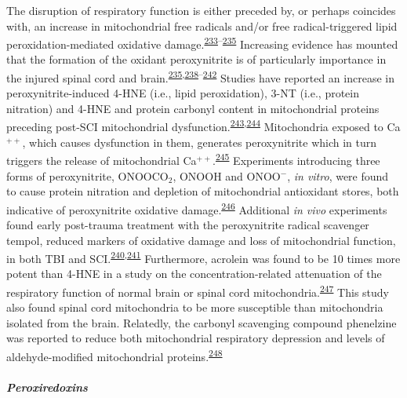 \documentclass[
]{article}
\begin{document}
The disruption of respiratory function is either preceded by, or perhaps coincides with, an increase in mitochondrial free radicals and/or free radical-triggered lipid peroxidation-mediated oxidative damage.\textsuperscript{\protect\hyperlink{ref-singh_time_2006}{233}--\protect\hyperlink{ref-sullivan_temporal_2007}{235}}
Increasing evidence has mounted that the formation of the oxidant peroxynitrite is of particularly importance in the injured spinal cord and brain.\textsuperscript{\protect\hyperlink{ref-sullivan_temporal_2007}{235},\protect\hyperlink{ref-bao_peroxynitrite_2002}{238}--\protect\hyperlink{ref-xiong_role_2007}{242}}
Studies have reported an increase in peroxynitrite-induced 4-HNE (i.e., lipid peroxidation), 3-NT (i.e., protein nitration) and 4-HNE and protein carbonyl content in mitochondrial proteins preceding post-SCI mitochondrial dysfunction.\textsuperscript{\protect\hyperlink{ref-lopez-figueroa_direct_2000}{243},\protect\hyperlink{ref-zanella_mitochondrial_2002}{244}}
Mitochondria exposed to Ca\(^{++}\), which causes dysfunction in them, generates peroxynitrite which in turn triggers the release of mitochondrial Ca\(^{++}\).\textsuperscript{\protect\hyperlink{ref-bringold_peroxynitrite_2000}{245}}
Experiments introducing three forms of peroxynitrite, ONOOCO\(_2\), ONOOH and ONOO\(^-\), \emph{in vitro}, were found to cause protein nitration and depletion of mitochondrial antioxidant stores, both indicative of peroxynitrite oxidative damage.\textsuperscript{\protect\hyperlink{ref-valdez_reactions_2000}{246}}
Additional \emph{in vivo} experiments found early post-trauma treatment with the peroxynitrite radical scavenger tempol, reduced markers of oxidative damage and loss of mitochondrial function, in both TBI and SCI.\textsuperscript{\protect\hyperlink{ref-deng_temporal_2007}{240},\protect\hyperlink{ref-xiong_pharmacological_2009}{241}}
Furthermore, acrolein was found to be 10 times more potent than 4-HNE in a study on the concentration-related attenuation of the respiratory function of normal brain or spinal cord mitochondria.\textsuperscript{\protect\hyperlink{ref-vaishnav_lipid_2010}{247}}
This study also found spinal cord mitochondria to be more susceptible than mitochondria isolated from the brain.
Relatedly, the carbonyl scavenging compound phenelzine was reported to reduce both mitochondrial respiratory depression and levels of aldehyde-modified mitochondrial proteins.\textsuperscript{\protect\hyperlink{ref-singh_phenelzine_2013}{248}}

\hypertarget{peroxiredoxins}{%
\subparagraph{Peroxiredoxins}\label{peroxiredoxins}}
\end{document}
